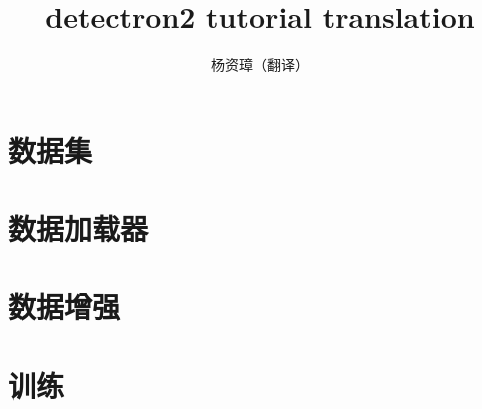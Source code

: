 \documentclass{ctexart}
\title{detectron2 tutorial translation}
\author{杨资璋（翻译）}
\begin{document}
\maketitle
\section{数据集}

\section{数据加载器}

\section{数据增强}

% 
% 
\section{训练}

% 
\end{document}
